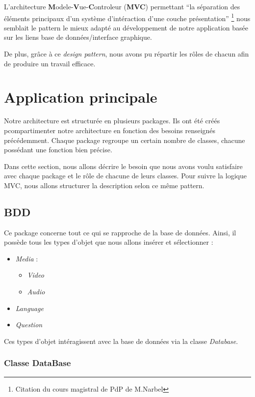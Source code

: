 L'architecture \textbf{M}odele-\textbf{V}ue-\textbf{C}ontroleur (\textbf{MVC}) permettant "`la séparation des éléments principaux d'un système d'intéraction d'une couche présentation"' \footnote{Citation du cours magistral de PdP de M.Narbel} nous semblait le pattern le mieux adapté au développement de notre application basée sur les liens base de données/interface graphique. 

De plus, grâce à ce \textit{design pattern}, nous avons pu répartir les rôles de chacun afin de produire un travail efficace.

\section{Application principale}

Notre architecture est structurée en plusieurs packages. Ils ont été créés pcompartimenter notre architecture en fonction des besoins renseignés précédemment. Chaque package regroupe un certain nombre de classes, chacune possédant une fonction bien précise.

Dans cette section, nous allons décrire le besoin que nous avons voulu satisfaire avec chaque package et le rôle de chacune de leurs classes. Pour suivre la logique MVC, nous allons structurer la description selon ce même pattern.


\subsection{BDD}

Ce package concerne tout ce qui se rapproche de la base de données. Ainsi, il possède tous les types d'objet que nous allons insérer et sélectionner :
\begin{itemize}
 \item \textit{Media} :
 \begin{itemize}
  \item \textit{Video}
  \item \textit{Audio}
 \end{itemize}
 \item \textit{Language}
 \item \textit{Question}
\end{itemize}
Ces types d'objet intéragissent avec la base de données via la classe \textit{Database}.


\subsubsection{Classe DataBase}

